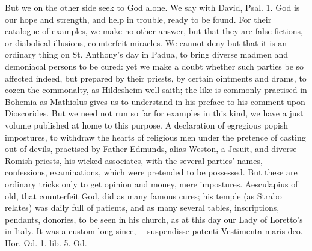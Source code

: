 {But we on the other side seek to God alone. We say with David, Psal.
 1. God is our hope and strength, and help in trouble, ready to be
found. For their catalogue of examples, we make no other answer, but
that they are false fictions, or diabolical illusions, counterfeit
miracles. We cannot deny but that it is an ordinary thing on St.
Anthony's day in Padua, to bring diverse madmen and demoniacal persons
to be cured: yet we make a doubt whether such parties be so affected
indeed, but prepared by their priests, by certain ointments and drams,
to cozen the commonalty, as  Hildesheim well saith; the like is
commonly practised in Bohemia as Mathiolus gives us to understand in
his preface to his comment upon Dioscorides. But we need not run so far
for examples in this kind, we have a just volume published at home to
this purpose. A declaration of egregious popish impostures, to
withdraw the hearts of religious men under the pretence of casting out
of devils, practised by Father Edmunds, alias Weston, a Jesuit, and
diverse Romish priests, his wicked associates, with the several parties'
names, confessions, examinations, \etc{} which were pretended to be
possessed. But these are ordinary tricks only to get opinion and money,
mere impostures. Aesculapius of old, that counterfeit God, did as many
famous cures; his temple (as Strabo relates) was daily full of
patients, and as many several tables, inscriptions, pendants, donories,
\etc{} to be seen in his church, as at this day our Lady of Loretto's in
Italy. It was a custom long since,
---suspendisse potenti
Vestimenta maris deo. Hor. Od. 1. lib. 5. Od.

}
